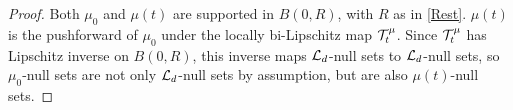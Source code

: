 \begin{proof}
Both $\mu_0$ and $\mu(t)$ are supported in $B(0,R)$, with $R$ as in \eqref{Rest}. $\mu(t)$ is the pushforward of $\mu_0$ under the locally bi-Lipschitz map $\mathcal{T}^\mu_t$. Since $\mathcal{T}^\mu_t$ has Lipschitz inverse on $B(0,R)$, this inverse maps $\mathcal{L}_d$-null sets to $\mathcal{L}_d$-null sets, so $\mu_0$-null sets are not only $\mathcal{L}_d$-null sets by assumption, but are also $\mu(t)$-null sets.
\end{proof}
%

